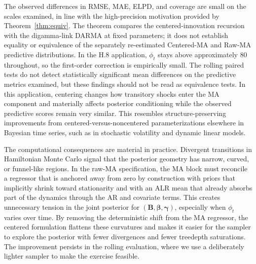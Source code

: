 \documentclass[12pt]{article}
\theoremstyle{remark}
\newcommand{\bfbeta}{\boldsymbol{\beta}}
\newcommand{\bfgamma}{\boldsymbol{\gamma}}
\newcommand{\bfB}{\mathbf{B}}
\begin{document}
The observed differences in RMSE, MAE, ELPD, and coverage are small on the scales examined, in line with the high-precision motivation provided by Theorem~\ref{thm:equiv}. The theorem compares the centered-innovation recursion with the digamma-link DARMA at fixed parameters; it does not establish equality or equivalence of the separately re-estimated Centered-MA and Raw-MA predictive distributions. In the H.8 application, $\phi_t$ stays above approximately $80$ throughout, so the first-order correction is empirically small. The rolling paired tests do not detect statistically significant mean differences on the predictive metrics examined, but these findings should not be read as equivalence tests. In this application, centering changes how transitory shocks enter the MA component and materially affects posterior conditioning while the observed predictive scores remain very similar. This resembles structure-preserving improvements from centered-versus-noncentered parameterizations elsewhere in Bayesian time series, such as in stochastic volatility and dynamic linear models.

The computational consequences are material in practice. Divergent transitions in Hamiltonian Monte Carlo signal that the posterior geometry has narrow, curved, or funnel-like regions. In the raw-MA specification, the MA block must reconcile a regressor that is anchored away from zero by construction with priors that implicitly shrink toward stationarity and with an ALR mean that already absorbs part of the dynamics through the AR and covariate terms. This creates unnecessary tension in the joint posterior for $(\bfB,\bfbeta,\bfgamma)$, especially when $\phi_t$ varies over time. By removing the deterministic shift from the MA regressor, the centered formulation flattens these curvatures and makes it easier for the sampler to explore the posterior with fewer divergences and fewer treedepth saturations. The improvement persists in the rolling evaluation, where we use a deliberately lighter sampler to make the exercise feasible.
\end{document}
